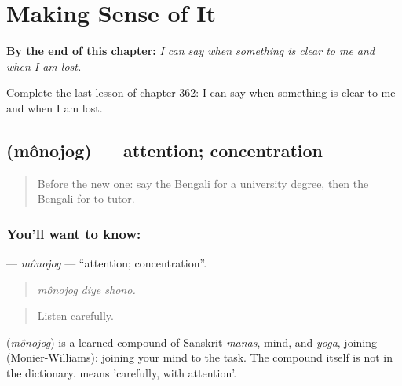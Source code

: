 
\chapter{Making Sense of It}
\label{ch:bn-making-sense-of-it}

\begin{chapteropening}
\textbf{By the end of this chapter:} \emph{I can say when something is clear to me and when I am lost.}

Complete the last lesson of chapter 362: I can say when something is clear to me and when I am lost.
\end{chapteropening}

\section[\texorpdfstring{\bn{মনোযোগ} (mônojog)}{মনোযোগ (mônojog)}]{ (mônojog) — attention; concentration}

\label{lesson:BN-C362-monojog}



\begin{quote}
Before the new one: say the Bengali for a university degree, then the Bengali for to tutor.
\end{quote}

\subsection*{You'll want to know: }
\textbf{} — \emph{mônojog} — \textquotedblleft{}attention; concentration\textquotedblright{}.

\begin{quote}
  
\end{quote}

\begin{quote}
\emph{mônojog diye shono.}
\end{quote}

\begin{quote}
Listen carefully.
\end{quote}

\begin{cousinweb}
\textbf{} (\emph{mônojog}) is a learned compound of Sanskrit \emph{manas}, mind, and \emph{yoga}, joining (Monier-Williams): joining your mind to the task. The compound itself is not in the dictionary.   means 'carefully, with attention'.
\end{cousinweb}

